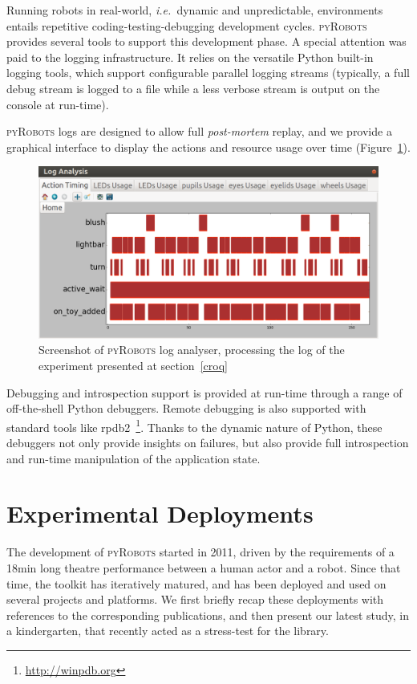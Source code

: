 \documentclass[a4paper, 10pt, conference]{ieeeconf}      %
\newcommand{\ie}{{\textit{i.e.\ }}}
\newcommand{\pyRobots}{\textsc{pyRobots}}
\begin{document}
Running robots in real-world, \ie dynamic and unpredictable, environments
entails repetitive coding-testing-debugging development cycles. \pyRobots{}
provides several tools to support this development phase. A special attention
was paid to the logging infrastructure. It relies on the versatile Python
built-in logging tools, which support configurable parallel logging streams
(typically, a full debug stream is logged to a file while a less verbose stream
is output on the console at run-time).

\pyRobots{} logs are designed to allow full \emph{post-mortem} replay, and we
provide a graphical interface to display the actions and resource usage over
time (Figure~\ref{log_view}).

\begin{figure}
        \centering
        \includegraphics[width=0.9\columnwidth]{log}
        \caption{Screenshot of \pyRobots{} log analyser, processing the log of the
        experiment presented at section~\ref{croq}}
        \label{log_view}
\end{figure}

Debugging and introspection support is provided at run-time through a range of
off-the-shell Python debuggers. Remote debugging is also supported with standard
tools like {\sc rpdb2}~\footnote{\url{http://winpdb.org}}. Thanks to the dynamic
nature of Python, these debuggers not only provide insights on failures, but
also provide full introspection and run-time manipulation of the application
state.


\section{Experimental Deployments}

The development of \pyRobots{} started in 2011, driven by the requirements of a
18min long theatre performance between a human actor and a robot. Since that
time, the toolkit has iteratively matured, and has been deployed and used on
several projects and platforms. We first briefly recap these deployments with
references to the corresponding publications, and then present our latest study,
in a kindergarten, that recently acted as a stress-test for the library.
\end{document}
